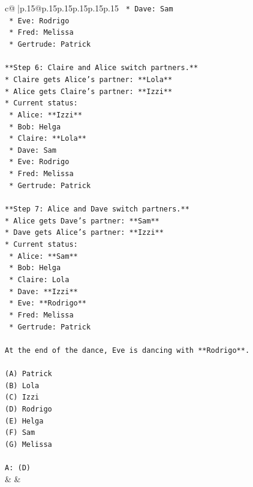 \documentclass{article}
\begin{document}
{\begin{supertabular}{c@{$\;$}|p{.15\linewidth}@{}p{.15\linewidth}p{.15\linewidth}p{.15\linewidth}p{.15\linewidth}p{.15\linewidth}}
{{{\texttt{    *   Dave: Sam} \\
\texttt{    *   Eve: Rodrigo} \\
\texttt{    *   Fred: Melissa} \\
\texttt{    *   Gertrude: Patrick} \\
\\ 
\texttt{**Step 6: Claire and Alice switch partners.**} \\
\texttt{*   Claire gets Alice's partner: **Lola**} \\
\texttt{*   Alice gets Claire's partner: **Izzi**} \\
\texttt{*   Current status:} \\
\texttt{    *   Alice: **Izzi**} \\
\texttt{    *   Bob: Helga} \\
\texttt{    *   Claire: **Lola**} \\
\texttt{    *   Dave: Sam} \\
\texttt{    *   Eve: Rodrigo} \\
\texttt{    *   Fred: Melissa} \\
\texttt{    *   Gertrude: Patrick} \\
\\ 
\texttt{**Step 7: Alice and Dave switch partners.**} \\
\texttt{*   Alice gets Dave's partner: **Sam**} \\
\texttt{*   Dave gets Alice's partner: **Izzi**} \\
\texttt{*   Current status:} \\
\texttt{    *   Alice: **Sam**} \\
\texttt{    *   Bob: Helga} \\
\texttt{    *   Claire: Lola} \\
\texttt{    *   Dave: **Izzi**} \\
\texttt{    *   Eve: **Rodrigo**} \\
\texttt{    *   Fred: Melissa} \\
\texttt{    *   Gertrude: Patrick} \\
\\ 
\texttt{At the end of the dance, Eve is dancing with **Rodrigo**.} \\
\\ 
\texttt{(A) Patrick} \\
\texttt{(B) Lola} \\
\texttt{(C) Izzi} \\
\texttt{(D) Rodrigo} \\
\texttt{(E) Helga} \\
\texttt{(F) Sam} \\
\texttt{(G) Melissa} \\
\\ 
\texttt{A: (D)} \\
            }
        }
    }
    & & \\ \\


\end{supertabular}}
\end{document}
